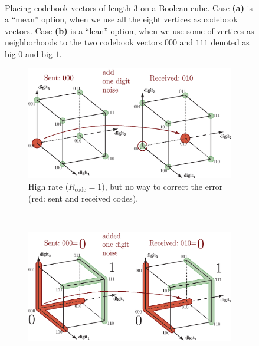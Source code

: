 \begin{figure}[bh!]
\begin{subfigure}[b]{.48\textwidth}
      \caption{}
      \label{fig:boolen_cube_vectors_2}
  \end{subfigure}
  \\[.5cm]
  \caption{Placing codebook vectors of length $3$ on a Boolean cube. Case \textbf{(a)}
    is a ``mean'' option, when we use all the eight vertices as codebook vectors. 
    Case \textbf{(b)} is a ``lean'' option, when we use some of vertices as 
    neighborhoods to the two codebook vectors $000$ and $111$ denoted as big $0$ and big $1$.}
  \label{fig:boolen_cube_vectors}
\end{figure}

\begin{figure}[th!]
  \centering
  \begin{subfigure}[b]{.85\textwidth}
      \includegraphics[width=\linewidth]{figures/ch_generic_approach/Boolean_Cube_8code_error}
      \caption{High rate ($R_{\text{code}}=1$), but no way to correct the error
      (red: sent and received codes).}
      \label{fig:boolen_cube_vectors_error_8}
  \end{subfigure}
  \\[.5cm]
  \begin{subfigure}[b]{.85\textwidth}
      \includegraphics[width=\linewidth]{figures/ch_generic_approach/Boolean_Cube_2code_error}

\end{subfigure}
\end{figure}
